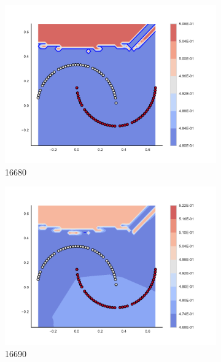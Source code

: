 \begin{figure}[h]
\begin{subfigure}[b]{0.09\textwidth}
    \includegraphics[clip, trim=2.35cm 1.75cm 4.5cm 0cm,width=\textwidth]{img/convergence/16680.pdf}
    \caption{16680}
    \label{fig:convergence_16680}
\end{subfigure}
%
\begin{subfigure}[b]{0.09\textwidth}
    \includegraphics[clip, trim=2.35cm 1.75cm 4.5cm 0cm,width=\textwidth]{img/convergence/16690.pdf}
    \caption{16690}
    \label{fig:convergence_16690}
\end{subfigure}
%
\begin{subfigure}[b]{0.09\textwidth}

\end{subfigure}
\end{figure}
